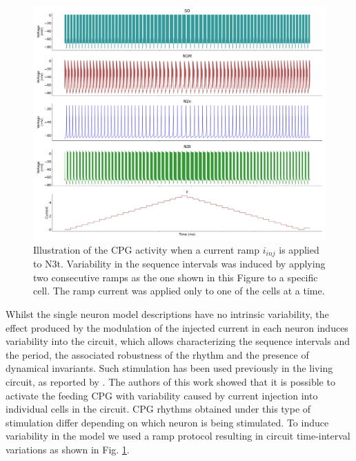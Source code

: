 \begin{figure}[hbt!]
	\centering
	\includegraphics[width=\textwidth]{img/methods-paper-modelo/circuit_w_current.pdf}
	\caption{Illustration of the CPG activity when a current ramp \(i_{inj}\) is applied to N3t. Variability in the sequence intervals was induced by applying two consecutive ramps as the one shown in this Figure to a specific cell. The ramp current was applied only to one of the cells at a time.}
	\label{fig:complete ramp example}
\end{figure}

Whilst the single neuron model descriptions have no intrinsic variability, the effect produced by the modulation of the injected current in each neuron induces variability into the circuit, which allows characterizing the sequence intervals and the period, the associated robustness of the rhythm and the presence of dynamical invariants. Such stimulation has been used previously in the living circuit, as reported by \textcite{elliott_temporal_1991}. The authors of this work showed that it is possible to activate the feeding CPG with variability caused by current injection into individual cells in the circuit. CPG rhythms obtained under this type of stimulation differ depending on which neuron is being stimulated. To induce variability in the model we used a ramp protocol resulting in circuit time-interval variations as shown in Fig. \ref{fig:complete ramp example}.



